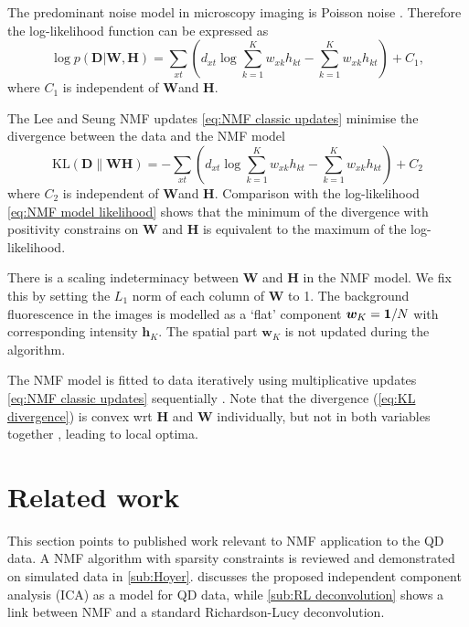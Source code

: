 The predominant noise model in microscopy imaging is Poisson noise \cite{PawleyHandbook2006}. Therefore the log-likelihood function can be expressed as
%
\begin{equation}
	\log p(\bm{D}|\bm{W},\bm{H})=\sum_{xt}\left(d_{xt}\log\sum_{k=1}^{K}w_{xk}h_{kt}-\sum_{k=1}^{K}w_{xk}h_{kt}\right)+C_{1},
	\label{eq:NMF model likelihood}
\end{equation}
%
where $C_{1}$ is independent of $\bm{W}$and $\bm{H}$. 

The Lee and Seung NMF updates \autoref{eq:NMF classic updates} minimise the divergence between the data and the NMF model
%
\begin{equation}
	\mbox{KL}(\bm{D}\parallel\bm{WH})=-\sum_{xt}\left(d_{xt}\log\sum_{k=1}^{K}w_{xk}h_{kt}-\sum_{k=1}^{K}w_{xk}h_{kt}\right)+C_{2}
	\label{eq:KL divergence}
\end{equation}
%
where $C_{2}$ is independent of $\bm{W}$and $\bm{H}$. Comparison with the log-likelihood \autoref{eq:NMF model likelihood} shows that the minimum of the divergence with positivity constrains on $\bm{W}$ and $\bm{H}$ is equivalent to the maximum of the log-likelihood. 

There is a scaling indeterminacy between $\bm{W}$ and $\bm{H}$ in the NMF model. We fix this by setting the $L_1$ norm of each column of $\bm{W}$ to 1. The background fluorescence in the images is modelled as a `flat' component $\bm{w}_{K} = \mathbf{1}/N$ with corresponding intensity $\bm{h}_{K}$. The spatial part $\bm{w}_{K}$ is not updated during the algorithm. 

The NMF model is fitted to data iteratively using multiplicative updates \autoref{eq:NMF classic updates} sequentially \cite{Lee2001}. Note that the divergence (\autoref{eq:KL divergence}) is convex wrt $\bm{H}$ and $\bm{W}$ individually, but not in both variables together \cite{Lee2001}, leading to local optima.


\clearpage
\section{Related work \label{sec:NMF related}}
This section points to published work relevant to NMF application to the QD data. A NMF algorithm with sparsity constraints is reviewed and demonstrated on simulated data in \autoref{sub:Hoyer}.  discusses the proposed independent component analysis (ICA) as a model for QD data, while \autoref{sub:RL deconvolution} shows a link between NMF and a standard Richardson-Lucy deconvolution.

